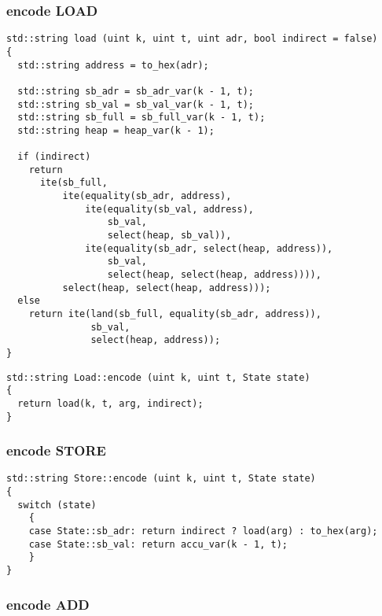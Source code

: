 \subsubsection{encode LOAD}

\begin{lstlisting}[style=c++]
std::string load (uint k, uint t, uint adr, bool indirect = false)
{
  std::string address = to_hex(adr);

  std::string sb_adr = sb_adr_var(k - 1, t);
  std::string sb_val = sb_val_var(k - 1, t);
  std::string sb_full = sb_full_var(k - 1, t);
  std::string heap = heap_var(k - 1);

  if (indirect)
    return
      ite(sb_full,
          ite(equality(sb_adr, address),
              ite(equality(sb_val, address),
                  sb_val,
                  select(heap, sb_val)),
              ite(equality(sb_adr, select(heap, address)),
                  sb_val,
                  select(heap, select(heap, address)))),
          select(heap, select(heap, address)));
  else
    return ite(land(sb_full, equality(sb_adr, address)),
               sb_val,
               select(heap, address));
}
\end{lstlisting}

\begin{lstlisting}[style=c++]
std::string Load::encode (uint k, uint t, State state)
{
  return load(k, t, arg, indirect);
}
\end{lstlisting}

\subsubsection{encode STORE}

\begin{lstlisting}[style=c++]
std::string Store::encode (uint k, uint t, State state)
{
  switch (state)
    {
    case State::sb_adr: return indirect ? load(arg) : to_hex(arg);
    case State::sb_val: return accu_var(k - 1, t);
    }
}
\end{lstlisting}

\subsubsection{encode ADD}

